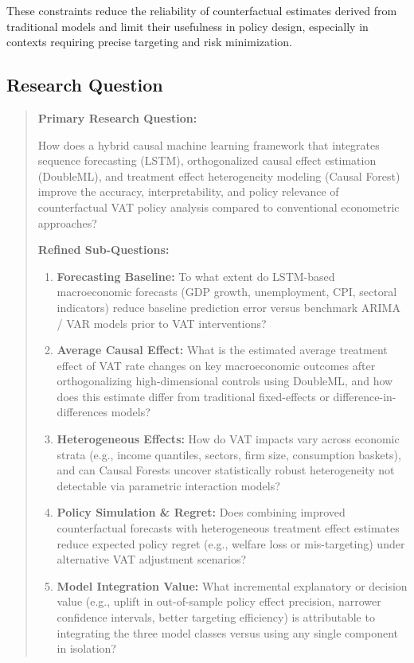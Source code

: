 These constraints reduce the reliability of counterfactual estimates derived from traditional models and limit their usefulness in policy design, especially in contexts requiring precise targeting and risk minimization.


\subsection{Research Question}\label{subsec:research_question}

\begin{quote}
\textbf{Primary Research Question:}

How does a hybrid causal machine learning framework that integrates sequence forecasting (LSTM), orthogonalized causal effect estimation (DoubleML), and treatment effect heterogeneity modeling (Causal Forest) improve the accuracy, interpretability, and policy relevance of counterfactual VAT policy analysis compared to conventional econometric approaches?

\textbf{Refined Sub-Questions:}

\begin{enumerate}
    \item \textbf{Forecasting Baseline:} To what extent do LSTM-based macroeconomic forecasts (GDP growth, unemployment, CPI, sectoral indicators) reduce baseline prediction error versus benchmark ARIMA / VAR models prior to VAT interventions?
    
    \item \textbf{Average Causal Effect:} What is the estimated average treatment effect of VAT rate changes on key macroeconomic outcomes after orthogonalizing high-dimensional controls using DoubleML, and how does this estimate differ from traditional fixed-effects or difference-in-differences models?
    
    \item \textbf{Heterogeneous Effects:} How do VAT impacts vary across economic strata (e.g., income quantiles, sectors, firm size, consumption baskets), and can Causal Forests uncover statistically robust heterogeneity not detectable via parametric interaction models?
    
    \item \textbf{Policy Simulation \& Regret:} Does combining improved counterfactual forecasts with heterogeneous treatment effect estimates reduce expected policy regret (e.g., welfare loss or mis-targeting) under alternative VAT adjustment scenarios?
    
    \item \textbf{Model Integration Value:} What incremental explanatory or decision value (e.g., uplift in out-of-sample policy effect precision, narrower confidence intervals, better targeting efficiency) is attributable to integrating the three model classes versus using any single component in isolation?

\end{enumerate}
\end{quote}

